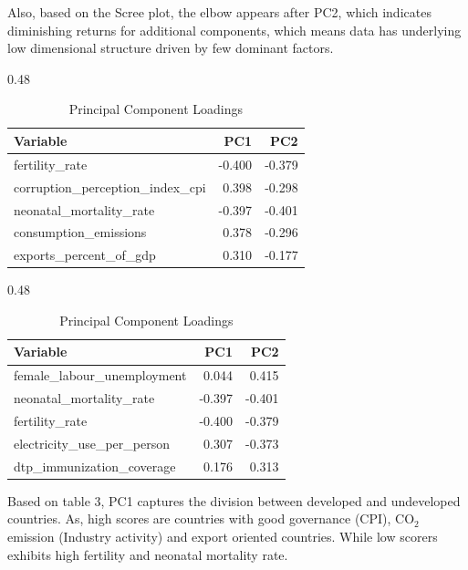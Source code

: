 \documentclass{article}
\begin{document}
Also, based on the Scree plot, the elbow appears after PC2, which indicates diminishing returns for additional components, which means data has underlying low dimensional structure driven by few dominant factors.

\begin{table}[htbp]
    \centering
    \begin{subtable}[t]{0.48\textwidth}
        \centering
        \caption{Top 5 Variables by PC1 Loadings}
        \label{tab:pc1}
        \begin{tabular}{@{}>{\raggedright\arraybackslash}p{5cm}rr@{}}
            \toprule
            Variable & PC1 & PC2 \\
            \midrule
            fertility\_rate & -0.400 & -0.379 \\
            corruption\_perception\_index\_cpi & 0.398 & -0.298 \\
            neonatal\_mortality\_rate & -0.397 & -0.401 \\
            consumption\_emissions & 0.378 & -0.296 \\
            exports\_percent\_of\_gdp & 0.310 & -0.177 \\
            \bottomrule
        \end{tabular}
    \end{subtable}
    \hfill
    \begin{subtable}[t]{0.48\textwidth}
        \centering
        \caption{Top 5 Variables by PC2 Loadings}
        \label{tab:pc2}
        \begin{tabular}{@{}>{\raggedright\arraybackslash}p{5cm}rr@{}}
            \toprule
            Variable & PC1 & PC2 \\
            \midrule
            female\_labour\_unemployment & 0.044 & 0.415 \\
            neonatal\_mortality\_rate & -0.397 & -0.401 \\
            fertility\_rate & -0.400 & -0.379 \\
            electricity\_use\_per\_person & 0.307 & -0.373 \\
            dtp\_immunization\_coverage & 0.176 & 0.313 \\
            \bottomrule
        \end{tabular}
    \end{subtable}
    \caption{Principal Component Loadings}
    \label{tab:pca_loadings}
\end{table}

Based on table 3, PC1 captures the division between developed and undeveloped countries. As, high scores are countries with good governance (CPI), $\mathrm{CO}_2$ emission (Industry activity) and export oriented countries. While low scorers exhibits high fertility and neonatal mortality rate.
\end{document}

